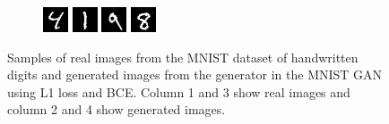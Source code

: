 \documentclass[11pt, fleqn, titlepage]{article}
\newcommand\skipperer{0.45pt}
\newcommand\ripperer{1.25pt}
\newcommand{\1}[1]{\mathds{1}\left[#1\right]}
\begin{document}
\begin{figure}[H]
\begin{subfigure}[b]{0.7\textwidth}
	\end{subfigure}
	\vskip\ripperer
	\begin{subfigure}[b]{0.7\textwidth}
		\centering
		\includegraphics[width=0.22\linewidth]{imgs/MNIST_GAN_normal_real_6}
		\hskip\skipperer
		\includegraphics[width=0.22\linewidth]{imgs/MNIST_GAN_normal_fake_6}
		\hskip\skipperer
		\includegraphics[width=0.22\linewidth]{imgs/MNIST_GAN_normal_real_7}
		\hskip\skipperer
		\includegraphics[width=0.22\linewidth]{imgs/MNIST_GAN_normal_fake_7}
	\end{subfigure}
	\caption{Samples of real images from the MNIST dataset of handwritten digits and generated images from the generator in the MNIST GAN using L1 loss and BCE. Column 1 and 3 show real images and column 2 and 4 show generated images.}
	\label{fig:generated_images_MNIST_GAN_normal}
\end{figure}
\end{document}
